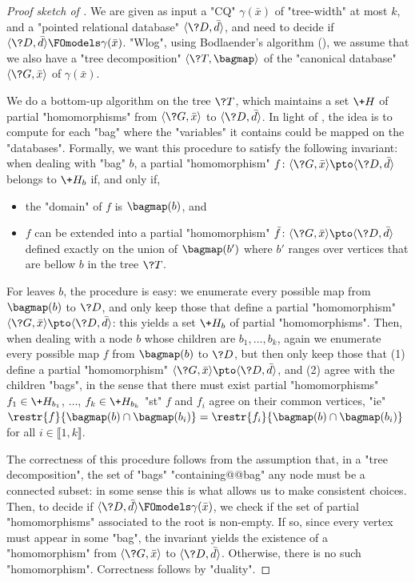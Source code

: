 \begin{proof}[Proof sketch of {}]
	We are given as input a "CQ" $\gamma(\bar x)$ of "tree-width" at most $k$,
	and a "pointed relational database" $\tup{\?D,\bar d}$, and need
	to decide if $\tup{\?D, \bar d} \FOmodels \gamma(\bar x)$.
	"Wlog", using Bodlaender's algorithm (),
	we assume that we also have a "tree decomposition" $\tup{\?T,\bagmap}$
	of the "canonical database" $\tup{\?G, \bar x}$ of $\gamma(\bar x)$.

	We do a bottom-up algorithm on the tree $\?T$,
	which maintains a set $\+H$ of partial "homomorphisms" from
	$\tup{\?G, \bar x}$ to $\tup{\?D, \bar d}$.
	In light of , the idea is to compute
	for each "bag" where the "variables" it contains could be mapped
	on the "databases".
	Formally, we want this procedure
	to satisfy the following invariant:
	when dealing with "bag" $b$, a partial "homomorphism"
	$f\colon \tup{\?G, \bar x} \pto \tup{\?D, \bar d}$ belongs to $\+H_b$ if, and only if,
	\begin{itemize}
		\item the "domain" of $f$ is $\bagmap(b)$, and
		\item $f$ can be extended into a partial "homomorphism"
			$\tilde f\colon \tup{\?G, \bar x} \pto \tup{\?D, \bar d}$
			defined exactly on the union of $\bagmap(b')$ where $b'$ ranges
			over vertices that are bellow $b$ in the tree $\?T$.
	\end{itemize}
	For leaves $b$, the procedure is easy: we enumerate every possible map
	from $\bagmap(b)$ to $\?D$, and only keep those that define a 
	partial "homomorphism" $\tup{\?G, \bar x} \pto \tup{\?D, \bar d}$: this
	yields a set $\+H_b$ of partial "homomorphisms".
	Then, when dealing with a node $b$ whose children are $b_1,\hdots,b_k$,
	again we enumerate every possible map $f$
	from $\bagmap(b)$ to $\?D$, but then only keep those that
	(1) define a partial "homomorphism" $\tup{\?G, \bar x} \pto \tup{\?D, \bar d}$,
	and (2) agree with the children "bags", in the sense that there must exist
	partial "homomorphisms" $f_1 \in \+H_{b_1}$, $\dotsc$, $f_k \in \+H_{b_k}$
	"st" $f$ and $f_i$ agree on their common vertices,
	"ie" $\restr{f}{\bagmap(b)\cap \bagmap(b_i)} = \restr{f_i}{\bagmap(b)\cap \bagmap(b_i)}$
	for all $i \in \lBrack 1,k\rBrack$.
	
	The correctness of this procedure follows from the assumption that,
	in a "tree decomposition", the set of "bags" "containing@@bag" any node
	must be a connected subset: in some sense this is what allows us to make
	consistent choices.
	Then, to decide if $\tup{\?D, \bar d} \FOmodels \gamma(\bar x)$,
	we check if the set of partial "homomorphisms" associated to the root
	is non-empty. If so, since every vertex must appear in some "bag",
	the invariant yields the existence of a "homomorphism" 
	from $\tup{\?G, \bar x}$ to $\tup{\?D, \bar d}$.
	Otherwise, there is no such "homomorphism". Correctness follows by "duality".


\end{proof}
